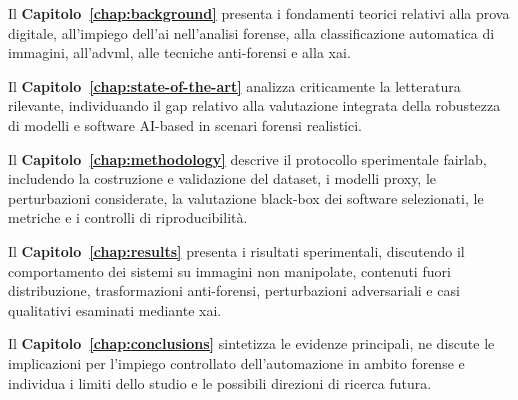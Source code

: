 Il \textbf{Capitolo~\ref{chap:background}} presenta i fondamenti teorici relativi alla prova digitale, all'impiego dell'\gls{ai} nell'analisi forense, alla classificazione automatica di immagini, all'\gls{advml}, alle tecniche anti-forensi e alla \gls{xai}.

Il \textbf{Capitolo~\ref{chap:state-of-the-art}} analizza criticamente la letteratura rilevante, individuando il gap relativo alla valutazione integrata della robustezza di modelli e software AI-based in scenari forensi realistici.

Il \textbf{Capitolo~\ref{chap:methodology}} descrive il protocollo sperimentale \gls{fairlab}, includendo la costruzione e validazione del dataset, i modelli proxy, le perturbazioni considerate, la valutazione black-box dei software selezionati, le metriche e i controlli di riproducibilità.

Il \textbf{Capitolo~\ref{chap:results}} presenta i risultati sperimentali, discutendo il comportamento dei sistemi su immagini non manipolate, contenuti fuori distribuzione, trasformazioni anti-forensi, perturbazioni adversariali e casi qualitativi esaminati mediante \gls{xai}.

Il \textbf{Capitolo~\ref{chap:conclusions}} sintetizza le evidenze principali, ne discute le implicazioni per l'impiego controllato dell'automazione in ambito forense e individua i limiti dello studio e le possibili direzioni di ricerca futura.
